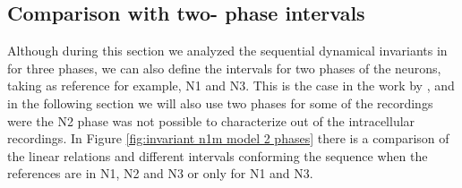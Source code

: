 \subsection{Comparison with two- phase intervals}
Although during this section we analyzed the sequential dynamical invariants in for three phases, we can also define the intervals for two phases of the neurons, taking as reference for example, N1 and N3. This is the case in the work by \cite{elices_robust_2019}, and in the following section we will also use two phases for some of the recordings were the N2 phase was not possible to characterize out of the intracellular recordings. In Figure \ref{fig:invariant n1m model 2 phases} there is a comparison of the linear relations and different intervals conforming the sequence when the references are in N1, N2 and N3 or only for N1 and N3.


%




